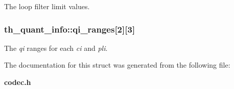 \-The loop filter limit values. 

\subsubsection[{qi\-\_\-ranges}]{ {\bf th\-\_\-quant\-\_\-info\-::qi\-\_\-ranges}[2][3]}\label{structth__quant__info_a6feacf4b365e305a7df7b93d87ee7bb8}


\-The {\itshape qi\/} ranges for each {\itshape ci\/} and {\itshape pli\/}. 



\-The documentation for this struct was generated from the following file\-:\begin{DoxyCompactItemize}
\item 
{\bf codec.\-h}\end{DoxyCompactItemize}
